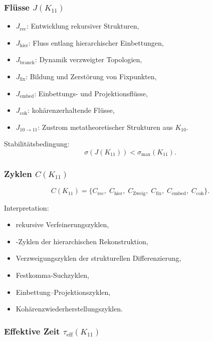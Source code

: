 \subsubsection{Flüsse $J(K_{11})$}

\begin{itemize}
    \item $J_{\mathrm{rec}}$: Entwicklung rekursiver Strukturen,
    \item $J_{\mathrm{hier}}$: Fluss entlang hierarchischer Einbettungen,
    \item $J_{\mathrm{branch}}$: Dynamik verzweigter Topologien,
    \item $J_{\mathrm{fix}}$: Bildung und Zerstörung von Fixpunkten,
    \item $J_{\mathrm{embed}}$: Einbettungs- und Projektionsflüsse,
    \item $J_{\mathrm{coh}}$: kohärenzerhaltende Flüsse,
    \item $J_{10\to11}$: Zustrom metatheoretischer Strukturen aus $K_{10}$.
\end{itemize}

Stabilitätsbedingung:
\[
\sigma(J(K_{11})) < \sigma_{\max}(K_{11}).
\]

\subsubsection{Zyklen $C(K_{11})$}

\[
C(K_{11})=
\{
C_{\mathrm{rec}},\;
C_{\mathrm{hier}},\;
C_{\mathrm{Zweig}},\;
C_{\mathrm{fix}},\;
C_{\mathrm{embed}},\;
C_{\mathrm{coh}}
\}.
\]

Interpretation:
\begin{itemize}
    \item rekursive Verfeinerungszyklen,
    \item-Zyklen der hierarchischen Rekonstruktion,
    \item Verzweigungszyklen der strukturellen Differenzierung,
    \item Festkomma-Suchzyklen,
    \item Einbettung–Projektionszyklen,
    \item Kohärenzwiederherstellungszyklen.
\end{itemize}

\subsubsection{Effektive Zeit $\tau_{\mathrm{eff}}(K_{11})$}

